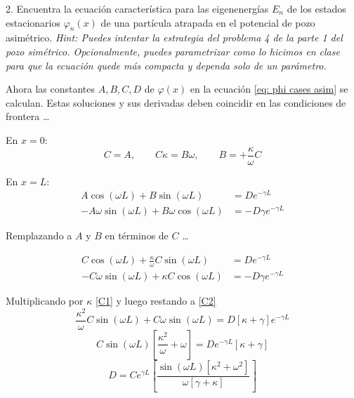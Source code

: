  
\begin{pregunta}{2.}
Encuentra la ecuación característica para las eigenenergías $E_n$ de los estados estacionarios $\varphi_n(x)$ de una partícula atrapada en el potencial de pozo asimétrico. \textit{Hint: Puedes intentar la estrategia del problema 4 de la parte 1 del pozo simétrico. Opcionalmente, puedes parametrizar como lo hicimos en clase para que la ecuación quede más compacta y dependa solo de un parámetro.}
\end{pregunta}



Ahora las constantes $A,B,C,D$ de $\varphi(x)$ en la ecuación \ref{eq: phi cases asim} se calculan. Estas soluciones y sus derivadas deben coincidir en las condiciones de frontera \dots

\noindent En $x=0$:
\begin{equation*}
\boxed{C = A}, \qquad C\kappa = B\omega, \qquad \boxed{B = +\frac{\kappa}{\omega}C}
\end{equation*}

\noindent En $x=L$:
\begin{align*}
A\cos(\omega L) + B\sin(\omega L) &= De^{-\gamma L} \\
-A\omega\sin(\omega L) + B\omega\cos(\omega L) &= -D\gamma e^{-\gamma L}
\end{align*}

Remplazando a $A$ y $B$ en términos de $C$ \dots

\begin{align}
C\cos(\omega L) + \frac{\kappa}{\omega}C\sin(\omega L) &= De^{-\gamma L} \label{C1} \\
-C\omega\sin(\omega L) + \kappa C\cos(\omega L) &= -D\gamma e^{-\gamma L} \label{C2}
\end{align}

Multiplicando por $\kappa$ \ref{C1} y luego restando a \ref{C2}
\begin{equation*}
\frac{\kappa^2}{\omega}C\sin(\omega L) + C\omega\sin(\omega L) = D[\kappa+\gamma]e^{-\gamma L}
\end{equation*}
\begin{equation*}
C\sin(\omega L)\left[\frac{\kappa^2}{\omega} + \omega\right] = De^{-\gamma L}[\kappa+\gamma]
\end{equation*}
\begin{equation*}
\boxed{D = C e^{\gamma L} \left[\frac{\sin(\omega L)\left[\kappa^2 + \omega^2\right]}{\omega[\gamma+\kappa]}\right]}
\end{equation*}

